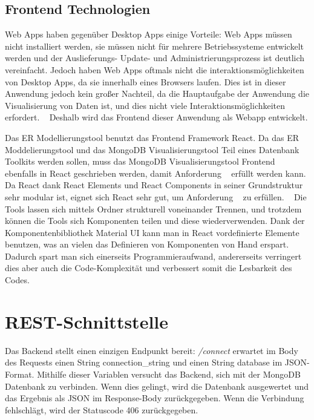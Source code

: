 \subsection{Frontend Technologien}
\label{sec:verwendete_technologien_frontend}

Web Apps haben gegenüber Desktop Apps einige Vorteile:
Web Apps müssen nicht installiert werden, sie müssen nicht für mehrere Betriebssysteme entwickelt werden und der Auslieferungs- Update- und Administrierungsprozess ist deutlich vereinfacht.
Jedoch haben Web Apps oftmals nicht die interaktionsmöglichkeiten von Desktop Apps, da sie innerhalb eines Browsers laufen.
Dies ist in dieser Anwendung jedoch kein großer Nachteil, da die Hauptaufgabe der Anwendung die Visualisierung von Daten ist, und dies nicht viele Interaktionsmöglichkeiten erfordert.
~\autocite{zepeda2007desktop}
Deshalb wird das Frontend dieser Anwendung als Webapp entwickelt.

Das ER Modellierungstool benutzt das Frontend Framework React.
Da das ER Moddelierungstool und das MongoDB Visualisierungstool Teil eines Datenbank Toolkits werden sollen, muss das MongoDB Visualisierungstool Frontend ebenfalls in React geschrieben werden, damit Anforderung ~ erfüllt werden kann.
Da React dank React Elements und React Components in seiner Grundstruktur  sehr modular ist, eignet sich React sehr gut, um Anforderung ~ zu erfüllen.
~\autocite{banks:react}
Die Tools lassen sich mittels Ordner strukturell voneinander Trennen, und trotzdem können die Tools sich Komponenten teilen und diese wiederverwenden.
Dank der Komponentenbibliothek Material UI kann man in React vordefinierte Elemente benutzen, was an vielen das Definieren von Komponenten von Hand erspart.
Dadurch spart man sich einerseits Programmieraufwand, andererseits verringert dies aber auch die Code-Komplexität und verbessert somit die Lesbarkeit des Codes.
~\autocite{mui:mui}

\section{REST-Schnittstelle}
\label{sec:rest_schnittstelle}
Das Backend stellt einen einzigen Endpunkt bereit: 
\textit{/connect} erwartet im Body des Requests einen String connection\_string und einen String database im JSON-Format.
Mithilfe dieser Variablen versucht das Backend, sich mit der MongoDB Datenbank zu verbinden.
Wenn dies gelingt, wird die Datenbank ausgewertet und das Ergebnis als JSON im Response-Body zurückgegeben.
Wenn die Verbindung fehlschlägt, wird der Statuscode 406 zurückgegeben.

